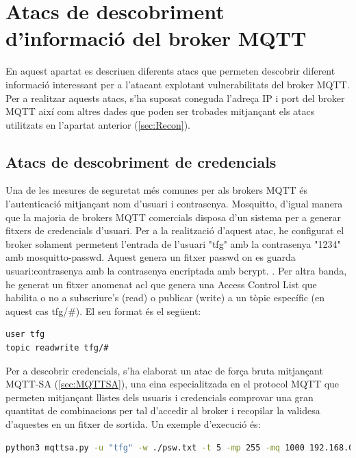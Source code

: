 \section{Atacs de descobriment d’informació del broker MQTT}

En aquest apartat es descriuen diferents atacs que permeten descobrir diferent informació interessant per a l'atacant explotant vulnerabilitats del broker MQTT. Per a realitzar aquests atacs, s'ha suposat coneguda l'adreça IP i port del broker MQTT així com altres dades que poden ser trobades mitjançant els atacs utilitzats en l'apartat anterior (\ref{sec:Recon}).


\subsection{Atacs de descobriment de credencials}

Una de les mesures de seguretat més comunes per als brokers MQTT és l'autenticació mitjançant nom d'usuari i contrasenya. Mosquitto, d'igual manera que la majoria de brokers MQTT comercials disposa d'un sistema per a generar fitxers de credencials d'usuari. Per a la realització d'aquest atac, he configurat el broker solament permetent l'entrada de l'usuari "tfg" amb la contrasenya "1234" amb mosquitto-passwd. Aquest genera un fitxer passwd on es guarda usuari:contrasenya amb la contrasenya encriptada amb bcrypt. \cite{bcryptexp}. Per altra banda, he generat un fitxer anomenat acl que genera una Access Control List que habilita o no a subscriure's (read) o publicar (write) a un tòpic específic (en aquest cas tfg/\#). El seu format és el següent:

\begin{lstlisting}[language=bash, caption={Access Control List}, label=lst:ACL]
user tfg
topic readwrite tfg/#
\end{lstlisting}

Per a descobrir credencials, s'ha elaborat un atac de força bruta mitjançant MQTT-SA (\ref{sec:MQTTSA}), una eina especialitzada en el protocol MQTT que permeten mitjançant llistes dels usuaris i credencials comprovar una gran quantitat de combinacions per tal d'accedir al broker i recopilar la validesa d'aquestes en un fitxer de sortida. Un exemple d'execució és:

\begin{lstlisting}[language=bash, caption={Execució de MQTT-SA}, label=lst:MQTTSAExec]
 python3 mqttsa.py -u "tfg" -w ./psw.txt -t 5 -mp 255 -mq 1000 192.168.0.40
\end{lstlisting}

